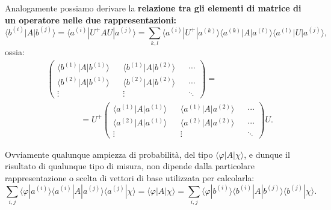 \documentclass[a4paper,12pt,oneside]{book}
\begin{document}
Analogamente possiamo derivare  la \textbf{relazione tra gli elementi di matrice di un operatore nelle due rappresentazioni:}
	\begin{equation}
		\boxed{
			\langle b^{(i)} | A | b^{(j)} \rangle = \langle a^{(i)} |  U^+AU | a^{(j)} \rangle = \sum \limits_{k,l} \langle a^{(i)} | U^+ |a^{(k)} \rangle \langle a^{(k)} | A | a^{(l)} \rangle \langle a^{(l)} | U  | a^{(j)} \rangle ,
			}
	\end{equation}
ossia:
	\begin{equation}
		\boxed{
		\begin{aligned}
			&\begin{pmatrix}
			\langle b^{(1)} | A | b^{(1)} \rangle  && \langle b^{(1)} | A | b^{(2)} \rangle && \cdots \\
			\langle b^{(2)} | A | b^{(1)} \rangle && \langle b^{(2)} | A | b^{(2)} \rangle && \cdots \\
			\vdots && \vdots && \ddots
			\end{pmatrix} = \\
			& \qquad\qquad = U^+
			\begin{pmatrix}
			\langle a^{(1)} | A | a^{(1)} \rangle && \langle a^{(1)} | A | a^{(2)} \rangle && \cdots \\
			\langle a^{(2)} | A | a^{(1)} \rangle && \langle a^{(2)} | A | a^{(2)} \rangle && \cdots \\
			\vdots && \vdots && \ddots
			\end{pmatrix} U .
		\end{aligned}
			}
	\end{equation}

Ovviamente qualunque ampiezza di probabilità, del tipo $ \langle \varphi | A | \chi \rangle $, e dunque il risultato di qualunque tipo di misura, non dipende dalla particolare rappresentazione o scelta di vettori di base utilizzata per calcolarla:
\begin{equation}
\sum \limits_{i,j} \langle \varphi | a^{(i)} \rangle \langle a^{(i)} | A | a^{(j)} \rangle \langle a^{(j)} | \chi \rangle = \langle \varphi | A | \chi \rangle = \sum \limits_{i,j} \langle \varphi | b^{(i)} \rangle \langle b^{(i)} | A | b^{(j)} \rangle \langle b^{(j)} | \chi \rangle .
\end{equation}
\end{document}
